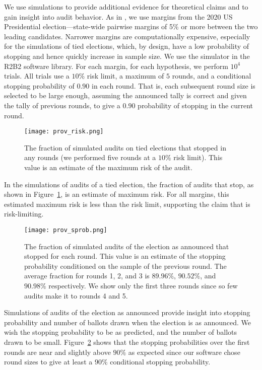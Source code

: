 We use simulations to provide additional evidence for theoretical claims and to gain insight into audit behavior. As in \cite{simulations}, we use margins from the 2020 US Presidential election---state-wide pairwise margins of 5\% or more between the two leading candidates. Narrower margins are computationally expensive, especially for the simulations of tied elections, which, by design, have a low probability of stopping and hence quickly increase in sample size. We use the simulator in the R2B2 software library\cite{r2b2_anon}. For each margin, for each hypothesis, we perform $10^4$ trials. All trials use a $10\%$ risk limit, a maximum of $5$ rounds, and a conditional stopping probability of $0.90$ in each round. That is, each subsequent round size is selected to be large enough, assuming the announced tally is correct and given the tally of previous rounds, to give a $0.90$ probability of stopping in the current round.

\begin{figure}
\texttt{[image: prov\_risk.png]}
\caption{The fraction of simulated \Providence audits on tied elections that stopped in any rounds (we performed five rounds at a $10\%$ risk limit). This value is an estimate of the maximum risk of the \Providence audit.}
\label{fig:prov-risk}
\end{figure}

In the simulations of \Providence audits of a tied election, the fraction of audits that stop, as shown in Figure~\ref{fig:prov-risk}, is an estimate of maximum risk. For all margins, this estimated maximum risk is less than the risk limit, supporting the claim that \Providence is risk-limiting.

\begin{figure}
\texttt{[image: prov\_sprob.png]}
\caption{The fraction of simulated \Providence audits of the election as announced that stopped for each round. This value is an estimate of the stopping probability conditioned on the sample of the previous round. The average fraction for rounds 1, 2, and 3 is $89.96\%$, $90.52\%$, and $90.98\%$ respectively. We show only the first three rounds since so few audits make it to rounds 4 and 5.}
\label{fig:prov-sprob}
\end{figure}

Simulations of audits of the election as announced provide insight into stopping probability and number of ballots drawn when the election is as announced. We wish the stopping probability to be as predicted, and the number of ballots drawn to be small. Figure~\ref{fig:prov-sprob} shows that the stopping probabilities over the first rounds are near and slightly above $90\%$ as expected since our software chose round sizes to give at least a $90\%$ conditional stopping probability.

